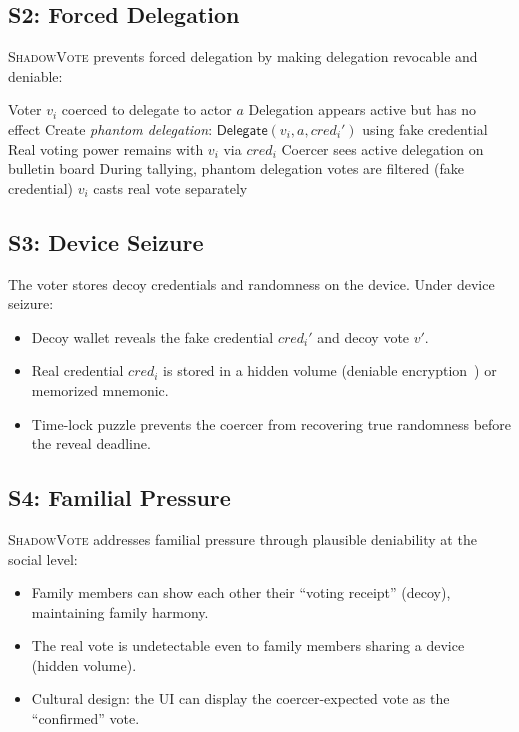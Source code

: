 \documentclass[11pt,a4paper]{article}
\newcommand{\shadow}{\textsc{ShadowVote}\xspace}
\begin{document}
\subsection{S2: Forced Delegation}

\shadow prevents forced delegation by making delegation revocable and deniable:

\begin{algorithm}[H]
\caption{Deniable Delegation}
\label{alg:deny-delegate}
\begin{algorithmic}[1]
\Require Voter $v_i$ coerced to delegate to actor $a$
\Ensure Delegation appears active but has no effect
\State Create \emph{phantom delegation}: $\mathsf{Delegate}(v_i, a, \mathit{cred}_i')$ using fake credential
\State Real voting power remains with $v_i$ via $\mathit{cred}_i$
\State Coercer sees active delegation on bulletin board
\State During tallying, phantom delegation votes are filtered (fake credential)
\State $v_i$ casts real vote separately
\end{algorithmic}
\end{algorithm}

\subsection{S3: Device Seizure}

The voter stores decoy credentials and randomness on the device. Under device seizure:

\begin{itemize}
    \item Decoy wallet reveals the fake credential $\mathit{cred}_i'$ and decoy vote $v'$.
    \item Real credential $\mathit{cred}_i$ is stored in a hidden volume (deniable encryption~\citep{canetti1997deniable}) or memorized mnemonic.
    \item Time-lock puzzle prevents the coercer from recovering true randomness before the reveal deadline.
\end{itemize}

\subsection{S4: Familial Pressure}

\shadow addresses familial pressure through plausible deniability at the social level:

\begin{itemize}
    \item Family members can show each other their ``voting receipt'' (decoy), maintaining family harmony.
    \item The real vote is undetectable even to family members sharing a device (hidden volume).
    \item Cultural design: the UI can display the coercer-expected vote as the ``confirmed'' vote.
\end{itemize}
\end{document}
